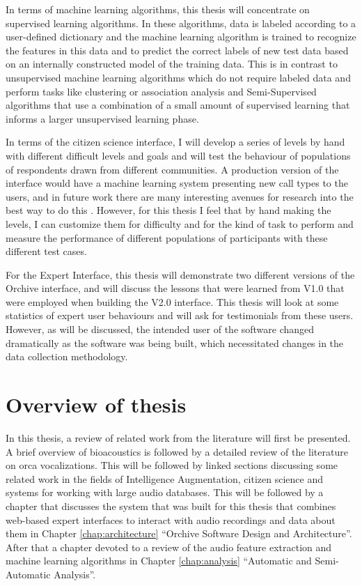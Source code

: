 \documentclass[12pt,oneside]{book}
\begin{document}
In terms of machine learning algorithms, this thesis will concentrate
on supervised learning algorithms.  In these algorithms, data is
labeled according to a user-defined dictionary and the machine
learning algorithm is trained to recognize the features in this data
and to predict the correct labels of new test data based on an
internally constructed model of the training data.  This is in
contrast to unsupervised machine learning algorithms which do not
require labeled data and perform tasks like clustering or association
analysis and Semi-Supervised algorithms \cite{chapelle2006} that use a
combination of a small amount of supervised learning that informs a
larger unsupervised learning phase.

In terms of the citizen science interface, I will develop a series of
levels by hand with different difficult levels and goals and will test
the behaviour of populations of respondents drawn from different
communities.  A production version of the interface would have a
machine learning system presenting new call types to the users, and in
future work there are many interesting avenues for research into the
best way to do this \cite{chen2013optimistic}.  However, for this
thesis I feel that by hand making the levels, I can customize them
for difficulty and for the kind of task to perform and measure the
performance of different populations of participants with these
different test cases.

For the Expert Interface, this thesis will demonstrate two different
versions of the Orchive interface, and will discuss the lessons that
were learned from V1.0 that were employed when building the V2.0
interface.  This thesis will look at some statistics of expert user
behaviours and will ask for testimonials from these users.  However,
as will be discussed, the intended user of the software changed
dramatically as the software was being built, which necessitated
changes in the data collection methodology.

\section{Overview of thesis}
\label{section:introduction:overview}

In this thesis, a review of related work from the literature will
first be presented.  A brief overview of bioacoustics is followed by a
detailed review of the literature on orca vocalizations.  This will be
followed by linked sections discussing some related work in the fields
of Intelligence Augmentation, citizen science and systems for working
with large audio databases.  This will be followed by a chapter that
discusses the system that was built for this thesis that combines
web-based expert interfaces to interact with audio recordings and data
about them in Chapter \ref{chap:architecture} ``Orchive Software
Design and Architecture''.  After that a chapter devoted to a review
of the audio feature extraction and machine learning algorithms in
Chapter \ref{chap:analysis} ``Automatic and Semi-Automatic Analysis''.  
\end{document}
